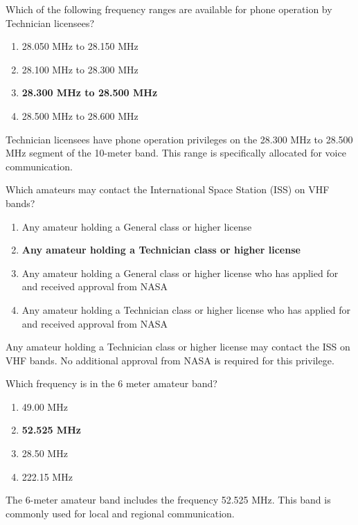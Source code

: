 \begin{tcolorbox}[colback=gray!10!white,colframe=black!75!black,title={T1B01}]
    Which of the following frequency ranges are available for phone operation by Technician licensees?
    \begin{enumerate}[label=\Alph*),noitemsep]
        \item 28.050 MHz to 28.150 MHz
        \item 28.100 MHz to 28.300 MHz
        \item \textbf{28.300 MHz to 28.500 MHz}
        \item 28.500 MHz to 28.600 MHz
    \end{enumerate}
\end{tcolorbox}
Technician licensees have phone operation privileges on the 28.300 MHz to 28.500 MHz segment of the 10-meter band. This range is specifically allocated for voice communication.


\begin{tcolorbox}[colback=gray!10!white,colframe=black!75!black,title={T1B02}]
    Which amateurs may contact the International Space Station (ISS) on VHF bands?
    \begin{enumerate}[label=\Alph*),noitemsep]
        \item Any amateur holding a General class or higher license
        \item \textbf{Any amateur holding a Technician class or higher license}
        \item Any amateur holding a General class or higher license who has applied for and received approval from NASA
        \item Any amateur holding a Technician class or higher license who has applied for and received approval from NASA
    \end{enumerate}
\end{tcolorbox}
Any amateur holding a Technician class or higher license may contact the ISS on VHF bands. No additional approval from NASA is required for this privilege.


\begin{tcolorbox}[colback=gray!10!white,colframe=black!75!black,title={T1B03}]
    Which frequency is in the 6 meter amateur band?
    \begin{enumerate}[label=\Alph*),noitemsep]
        \item 49.00 MHz
        \item \textbf{52.525 MHz}
        \item 28.50 MHz
        \item 222.15 MHz
    \end{enumerate}
\end{tcolorbox}
The 6-meter amateur band includes the frequency 52.525 MHz. This band is commonly used for local and regional communication.

